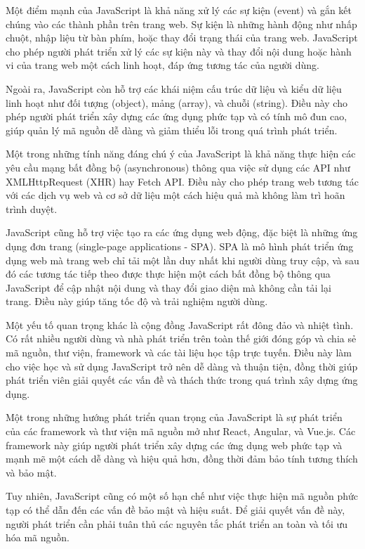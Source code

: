 Một điểm mạnh của JavaScript là khả năng xử lý các sự kiện (event) và gắn kết chúng vào các thành phần trên trang web. Sự kiện là những hành động như nhấp chuột, nhập liệu từ bàn phím, hoặc thay đổi trạng thái của trang web. JavaScript cho phép người phát triển xử lý các sự kiện này và thay đổi nội dung hoặc hành vi của trang web một cách linh hoạt, đáp ứng tương tác của người dùng.

Ngoài ra, JavaScript còn hỗ trợ các khái niệm cấu trúc dữ liệu và kiểu dữ liệu linh hoạt như đối tượng (object), mảng (array), và chuỗi (string). Điều này cho phép người phát triển xây dựng các ứng dụng phức tạp và có tính mô đun cao, giúp quản lý mã nguồn dễ dàng và giảm thiểu lỗi trong quá trình phát triển.

Một trong những tính năng đáng chú ý của JavaScript là khả năng thực hiện các yêu cầu mạng bất đồng bộ (asynchronous) thông qua việc sử dụng các API như XMLHttpRequest (XHR) hay Fetch API. Điều này cho phép trang web tương tác với các dịch vụ web và cơ sở dữ liệu một cách hiệu quả mà không làm trì hoãn trình duyệt. \cite{js_2}

JavaScript cũng hỗ trợ việc tạo ra các ứng dụng web động, đặc biệt là những ứng dụng đơn trang (single-page applications - SPA). SPA là mô hình phát triển ứng dụng web mà trang web chỉ tải một lần duy nhất khi người dùng truy cập, và sau đó các tương tác tiếp theo được thực hiện một cách bất đồng bộ thông qua JavaScript để cập nhật nội dung và thay đổi giao diện mà không cần tải lại trang. Điều này giúp tăng tốc độ và trải nghiệm người dùng.

Một yếu tố quan trọng khác là cộng đồng JavaScript rất đông đảo và nhiệt tình. Có rất nhiều người dùng và nhà phát triển trên toàn thế giới đóng góp và chia sẻ mã nguồn, thư viện, framework và các tài liệu học tập trực tuyến. Điều này làm cho việc học và sử dụng JavaScript trở nên dễ dàng và thuận tiện, đồng thời giúp phát triển viên giải quyết các vấn đề và thách thức trong quá trình xây dựng ứng dụng.

Một trong những hướng phát triển quan trọng của JavaScript là sự phát triển của các framework và thư viện mã nguồn mở như React, Angular, và Vue.js. Các framework này giúp người phát triển xây dựng các ứng dụng web phức tạp và mạnh mẽ một cách dễ dàng và hiệu quả hơn, đồng thời đảm bảo tính tương thích và bảo mật.

Tuy nhiên, JavaScript cũng có một số hạn chế như việc thực hiện mã nguồn phức tạp có thể dẫn đến các vấn đề bảo mật và hiệu suất. Để giải quyết vấn đề này, người phát triển cần phải tuân thủ các nguyên tắc phát triển an toàn và tối ưu hóa mã nguồn.

